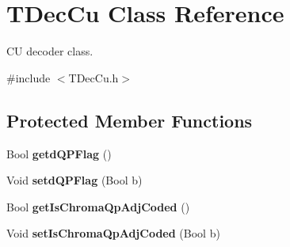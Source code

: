 \hypertarget{class_t_dec_cu}{}\section{T\+Dec\+Cu Class Reference}
\label{class_t_dec_cu}


CU decoder class.  




{\ttfamily \#include $<$T\+Dec\+Cu.\+h$>$}

\subsection*{Protected Member Functions}
\begin{DoxyCompactItemize}
\item 
\mbox{\label{class_t_dec_cu_a147e0d4fd0df9b9032c4b5748280a1a8}} 
Bool {\bfseries getd\+Q\+P\+Flag} ()
\item 
\mbox{\label{class_t_dec_cu_a027b9acbba4ae1231de2539b24b438d5}} 
Void {\bfseries setd\+Q\+P\+Flag} (Bool b)
\item 
\mbox{\label{class_t_dec_cu_a1e6769959e1bbb2aa42e5e1ddbb2c637}} 
Bool {\bfseries get\+Is\+Chroma\+Qp\+Adj\+Coded} ()
\item 
\mbox{\label{class_t_dec_cu_a9dd0083f7468cc8047430fe74e30af56}} 
Void {\bfseries set\+Is\+Chroma\+Qp\+Adj\+Coded} (Bool b)
\end{DoxyCompactItemize}
